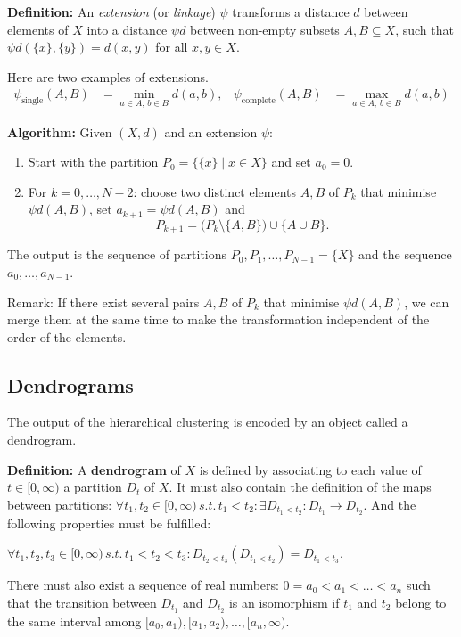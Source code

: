 \documentclass[11pt,a4paper]{article}
\begin{document}
\textbf{Definition:}
An \emph{extension} (or \emph{linkage}) $\psi$ transforms a distance $d$ between elements of $X$ into a distance $\psi d$ between non-empty subsets $A,B \subseteq X$, such that $\psi d(\{x\},\{y\}) = d(x,y)$ for all $x,y\in X$.
 
Here are two examples of extensions.
\begin{align*}
\psi_{\text{single}}(A,B) &= \min_{a\in A,\, b\in B} d(a,b), &
\psi_{\text{complete}}(A,B) &= \max_{a\in A,\, b\in B} d(a,b)
\end{align*}
 
\textbf{Algorithm:}
Given $(X,d)$ and an extension $\psi$:
\begin{enumerate}
    \item Start with the partition $P_0=\{\{x\} \mid x\in X\}$ and set $a_0=0$.
    \item For $k=0,\dots,N-2$: choose two distinct elements $A,B$ of $P_k$ that minimise $\psi d(A,B)$, set $a_{k+1}=\psi d(A,B)$ and
    \[
        P_{k+1} = \big(P_k \setminus \{A,B\}\big)\cup\{A\cup B\}.
    \]
\end{enumerate}
The output is the sequence of partitions $P_0, P_1, \dots, P_{N-1}=\{X\}$ and the sequence $a_0,\dots,a_{N-1}$.

Remark: If there exist several pairs $A,B$ of $P_k$ that minimise $\psi d(A,B)$, we can merge them at the same time to make the transformation independent of the order of the elements.

 
\subsection{Dendrograms}
The output of the hierarchical clustering is encoded by an object called a dendrogram.
 
\textbf{Definition:}
A \textbf{dendrogram} of $X$ is defined by associating to each value of $t \in [0,\infty)$ a partition $D_t$ of $X$. It must also contain the definition of the maps between partitions: $\forall t_1, t_2 \in [0,\infty) \, s.t. \, t_1<t_2: \exists D_{t_1<t_2}: D_{t_1} \rightarrow D_{t_2}$. And the following properties must be fulfilled:

$\forall t_1, t_2, t_3 \in [0,\infty) \, s.t. \, t_1<t_2<t_3:  D_{t_2<t_3} (D_{t_1<t_2}) = D_{t_1<t_3}$.

There must also exist a sequence of real numbers: $0=a_0<a_1<\dots<a_n$ such that the transition between $D_{t_1}$ and $D_{t_2}$ is an isomorphism if $t_1$ and $t_2$ belong to the same interval among $[a_0,a_1),[a_1,a_2),\dots,[a_n,\infty)$.
 
\end{document}
